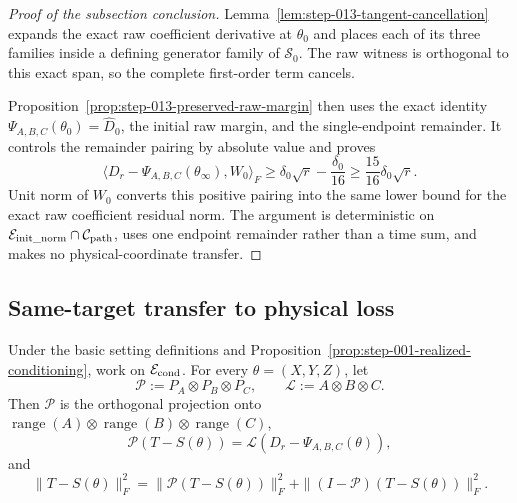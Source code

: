 \begin{proof}[Proof of the subsection conclusion]

Lemma~\ref{lem:step-013-tangent-cancellation} expands the exact raw
coefficient derivative at \(\theta_0\) and places each of its three families
inside a defining generator family of \(\mathscr S_0\). The raw
witness is orthogonal to this exact span, so the complete first-order term
cancels.

Proposition~\ref{prop:step-013-preserved-raw-margin} then uses the exact
identity \(\Psi_{A,B,C}(\theta_0)=\widehat D_0\), the initial raw
margin, and the single-endpoint remainder. It controls the remainder
pairing by absolute value and proves
\[
  \langle D_r-\Psi_{A,B,C}(\theta_\infty),W_0\rangle_F
  \ge\delta_0\sqrt r-\frac{\delta_0}{16}
  \ge\frac{15}{16}\delta_0\sqrt r.
\]
Unit norm of \(W_0\) converts this positive pairing into the same lower bound
for the exact raw coefficient residual norm. The argument is deterministic
on \(\mathcal E_{\rm init\_norm}\cap\mathcal C_{\rm path}\), uses one endpoint
remainder rather than a time sum, and makes no physical-coordinate transfer.

\end{proof}

\subsection{Same-target transfer to physical loss}\label{app:step-014}

\begin{lemma}
\label{lem:step-014-mode-span-projection}
Under the basic setting definitions and Proposition~\ref{prop:step-001-realized-conditioning}, work on
\(\mathcal E_{\rm cond}\). For every \(\theta=(X,Y,Z)\), let
\[
  \mathcal P:=P_A\otimes P_B\otimes P_C,
  \qquad \mathcal L:=A\otimes B\otimes C.
\]
Then \(\mathcal P\) is the orthogonal projection onto
\(\operatorname{range}(A)\otimes\operatorname{range}(B)\otimes
\operatorname{range}(C)\),
\begin{equation}
  \mathcal P(T-S(\theta))
  =\mathcal L(D_r-\Psi_{A,B,C}(\theta)),                   \label{eq:step-014-3}
\end{equation}
and
\begin{equation}
  \|T-S(\theta)\|_F^2
  =\|\mathcal P(T-S(\theta))\|_F^2
   +\|(I-\mathcal P)(T-S(\theta))\|_F^2.                 \label{eq:step-014-4}
\end{equation}

\end{lemma}

